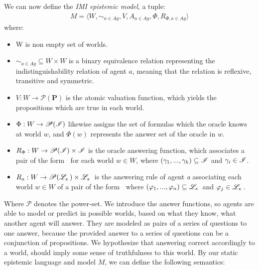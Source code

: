 We can now define the \textit{IMI epistemic model}, a tuple:
\begin{align}
	M = \langle W, \sim_{a\in Ag}, V, A_{a\in Ag}, \Phi, R_{\Phi, a\in Ag}\rangle
\end{align}
where:
\begin{itemize}
	\setlength\itemsep{-0.4em}
	\item W is non empty set of worlds.
	\item $\sim_{a\in Ag} \subseteq W \times W$ is a binary equivalence relation representing the indistinguishability relation of agent $a$, meaning that the relation is reflexive, transitive and symmetric.
	\item $V : W \rightarrow \mathscr{P}(\mathbf{P})$ is the atomic valuation function, which yields the propositions which are true in each world. 
	\item $\Phi : W \rightarrow \mathscr{P}(\mathscr{I}) $ likewise assigns the set of formulas which the oracle knows at world $w$, and $\Phi(w)$ represents the answer set of the oracle in $w$.
	\item $R_{\Phi} : W \rightarrow \mathscr{P}(\mathscr{I}) \times \mathscr{I}$ is the oracle answering function, which associates a pair of the form \oset $\:$ for each world $w \in W$, where $(\gamma_1,...,\gamma_k) \subseteq \mathscr{I}$ and $\gamma_i \in \mathscr{I}$.
	\item $R_a : W \rightarrow \mathscr{P}(\mathscr{L}_s \:) \times \mathscr{L}_s \:$ is the answering rule of agent \textit{a} associating each world $w \in W$ of a pair of the form \aset $\:$ where $(\varphi_1,...,\varphi_n) \subseteq \mathscr{L}_s \:$ and $\varphi_j \in \mathscr{L}_s \:$.
\end{itemize}
Where $\mathscr{P}$ denotes the power-set. We introduce the answer functions, so agents are able to model or predict in possible worlds, based on what they know, what another agent will answer. They are modeled as pairs of a series of questions to one answer, because the provided answer to a series of questions can be a conjunction of propositions. We hypothesize that answering correct accordingly to a world, should imply some sense of truthfulness to this world. By our static epistemic language \staticlang and model $M$, we can define the following semantics:

